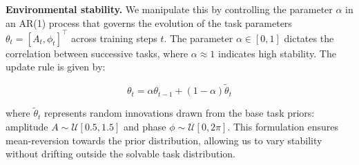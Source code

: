 \textbf{Environmental stability.} We manipulate this by controlling the parameter $\alpha$ in an AR(1) process that governs the evolution of the task parameters $\theta_t = [A_t, \phi_t]^\top$ across training steps $t$. The parameter $\alpha \in [0, 1]$ dictates the correlation between successive tasks, where $\alpha \approx 1$ indicates high stability. The update rule is given by:

\begin{equation}
\theta_t = \alpha \theta_{t-1} + (1-\alpha)\tilde{\theta}_t
\label{eq:sinusoid_ar1}
\end{equation}

where $\tilde{\theta}_t$ represents random innovations drawn from the base task priors: amplitude $A \sim \mathcal{U}[0.5, 1.5]$ and phase $\phi \sim \mathcal{U}[0, 2\pi]$. This formulation ensures mean-reversion towards the prior distribution, allowing us to vary stability without drifting outside the solvable task distribution.





